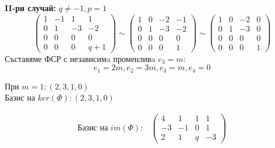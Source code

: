 \documentclass{article}
\begin{document}
\textbf{II-ри случай:} $q\neq-1, p=1$
\[
    \left(\begin{array}{cccc}
            1 & -1 & 1  & 1   \\
            0 & 1  & -3 & -2  \\
            0 & 0  & 0  & 0   \\
            0 & 0  & 0  & q+1
        \end{array}\right)
    \sim\left(\begin{array}{cccc}
            1 & 0 & -2 & -1 \\
            0 & 1 & -3 & -2 \\
            0 & 0 & 0  & 0  \\
            0 & 0 & 0  & 1
        \end{array}\right)
    \sim\left(\begin{array}{cccc}
            1 & 0 & -2 & 0 \\
            0 & 1 & -3 & 0 \\
            0 & 0 & 0  & 0 \\
            0 & 0 & 0  & 1
        \end{array}\right)
\]
Съставяме ФСР с независимa променливa $e_3=m$:
\[
    e_1=2m, e_2=3m, e_3=m, e_4=0
\]
\begin{center}
    При $m=1:(2,3,1,0)$\\
    Базис на $ker(\Phi):(2,3,1,0)$
\end{center}
\begin{align*}
    \text{Базис на $im(\Phi):$}
     & \left(\begin{array}{cccc}
                     4  & 1  & 1 & 1  \\
                     -3 & -1 & 0 & 1  \\
                     2  & 1  & q & -3
                 \end{array}
    \right)
\end{align*}
\end{document}
